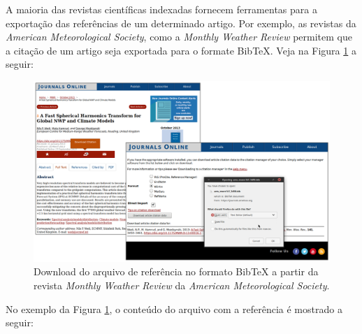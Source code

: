 A maioria das revistas científicas indexadas fornecem ferramentas para a exportação das referências de um determinado artigo. Por exemplo, as revistas da \textit{American Meteorological Society}, como a \textit{Monthly Weather Review} permitem que a citação de um artigo seja exportada para o formate BibTeX. Veja na Figura \ref{fig:exemplo_revista_ams_citacao} a seguir:

\begin{figure}[H]
    \centering
    \includegraphics[scale=0.4]{./figs/exemplo_revista_ams_citacao.png}
    \caption{Download do arquivo de referência no formato BibTeX a partir da revista \textit{Monthly Weather Review} da \textit{American Meteorological Society}.}
    \label{fig:exemplo_revista_ams_citacao}
\end{figure}

No exemplo da Figura \ref{fig:exemplo_revista_ams_citacao}, o conteúdo do arquivo com a referência é mostrado a seguir:

